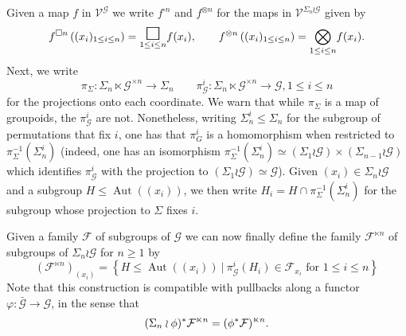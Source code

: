 \documentclass[a4paper,10pt
,draft
]{article}%
\numberwithin{equation}{section}
\numberwithin{figure}{section}
\theoremstyle{definition} %
\DeclareMathOperator{\Aut}{Aut}%
\newcommand{\F}{\ensuremath{\mathcal F}}
\newcommand{\G}{\ensuremath{\mathcal G}}
\newcommand{\1}{\ensuremath{\mathbbm 1}}%
\begin{document}
Given a map $f$ in $\mathcal{V}^{\G}$
we write 
$f^{\square n}$  and 
$f^{\otimes n}$
for the maps in $\mathcal{V}^{\Sigma_n \wr \G}$
given by
\begin{equation}\label{FSQNDEF EQ}
f^{\square n}\left((x_i)_{1\leq i \leq n }\right)
=
\underset{1\leq i \leq n}{\mathlarger{\mathlarger{\mathlarger{\square}}}} f(x_i),
\qquad
f^{\otimes n}\left((x_i)_{1\leq i \leq n }\right)
=
\underset{1\leq i \leq n}{\bigotimes} f(x_i).
\end{equation}
Next, we write
\[
\pi_{\Sigma} \colon \Sigma_n \ltimes \G^{\times n} \to \Sigma_n
\qquad
\pi^i_{\G} \colon \Sigma_n \ltimes \G^{\times n} \to \G, 1\leq i \leq n
\]
for the projections onto each coordinate.
We warn that while $\pi_{\Sigma}$ is a map of groupoids, 
the $\pi^i_{\G}$ are not.
Nonetheless, writing $\Sigma^i_n \leq \Sigma_n$
for the subgroup of permutations that fix $i$, 
one has that $\pi_{G}^i$ is a homomorphism when restricted to 
$\pi^{-1}_{\Sigma}(\Sigma_n^i)$ 
(indeed, one has an isomorphism 
$\pi^{-1}_{\Sigma}(\Sigma_n^i) \simeq 
(\Sigma_{1} \wr \G) \times (\Sigma_{n-1} \wr \G)$
which identifies $\pi_{\G}^i$ with the projection to 
$(\Sigma_{1} \wr \G) \simeq \G$).
Given $(x_i) \in \Sigma_n \wr \G$
and a subgroup
$H \leq \Aut((x_i))$,
we then write
$H_i = H \cap \pi^{-1}_{\Sigma}(\Sigma_n^i)$
for the subgroup whose projection to $\Sigma$ fixes $i$.

Given a family $\F$ of subgroups of $\G$
we can now finally define the family $\F^{\ltimes n}$
of subgroups of $\Sigma_n \wr \G$ for $n\geq 1$ by
\begin{equation}\label{FWRNXI EQ}
\left(\F^{\ltimes n}\right)_{(x_i)}
=
\left\{
      H \leq \Aut((x_i))
      \ | \
      \pi^i_{\G}(H_i) \in \F_{x_i} \text{ for } 1 \leq i \leq n
\right\}
\end{equation}
Note that this construction is compatible with pullbacks
along a functor $\varphi \colon \bar{\G} \to \G$, in the sense that 
\begin{equation}
      \label{PHIFLTIMES_EQ}
      (\Sigma_n \wr \phi)^{\**}\F^{\ltimes n} = (\phi^{\**} \F)^{\ltimes n}.
\end{equation}
\end{document}
